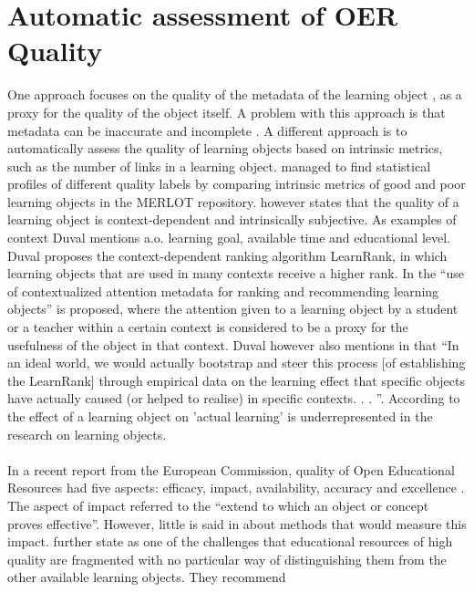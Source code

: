 \section{Automatic assessment of OER Quality}
\label{sec:background_quality_assess}
One approach focuses on the quality of the metadata of the learning
object \citep{Ochoa2009b, Tani2013} , as a proxy for the quality of the object
itself. A problem with this approach is that metadata can be inaccurate
\citep{Cechinel2009} and incomplete \citep{Sicilia2005}. A different approach is
to automatically assess the quality of learning objects based on intrinsic
metrics, such as the number of links in a learning object. \citet{Cechinel2011}
managed to find statistical profiles of different quality labels by comparing
intrinsic metrics of good and poor learning objects in the MERLOT repository.
\citet{Duval2006} however states that the quality of a learning object is
context-dependent and intrinsically subjective. As examples of context Duval
mentions a.o. learning goal, available time and educational level. Duval
proposes the context-dependent ranking algorithm LearnRank, in which learning
objects that are used in many contexts receive a higher rank. In
\citep{Ochoa2006} the “use of contextualized attention metadata for ranking and
recommending learning objects” is proposed, where the attention given to a
learning object by a student or a teacher within a certain context is
considered to be a proxy for the usefulness of the object in that context.
Duval however also mentions in \citep{Duval2006} that “In an ideal world, we
would actually bootstrap and steer this process [of establishing the LearnRank]
through empirical data on the learning effect that specific objects have
actually caused (or helped to realise) in specific contexts. . . ”. According
to \citep{Kay2007} the effect of a learning object on ’actual learning’ is
underrepresented in the research on learning objects.\\\\
\noindent
In a recent report from the European Commission, quality of Open Educational
Resources had five aspects: efficacy, impact, availability, accuracy and
excellence \citep{Camilleri2014}. The aspect of impact referred to the “extend
to which an object or concept proves effective”. However, little is said in
\citet{Camilleri2014} about methods that would measure this impact.
\citeauthor{Camilleri2014} further state as one of the challenges that
educational resources of high quality are fragmented with no particular way of
distinguishing them from the other available learning objects. They recommend
